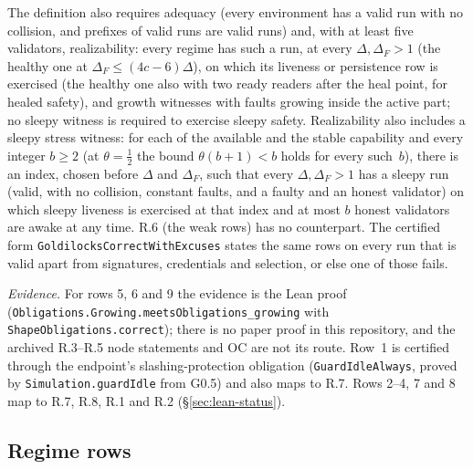 \documentclass{article}
\begin{document}
\begin{sloppypar}
The definition also requires adequacy (every environment has a valid run
with no collision, and prefixes of valid runs are valid runs) and, with at
least five validators, realizability: every regime has such a run, at
every $\Delta,\Delta_F>1$ (the healthy one at $\Delta_F\leq(4c-6)\Delta$), on which its liveness or persistence row is
exercised (the healthy one also with two ready readers after the heal
point, for healed safety), and growth witnesses with faults growing inside
the active part; no sleepy witness is required to exercise sleepy
safety.  Realizability also includes a sleepy stress witness: for each of
the available and the stable capability and every integer $b\geq2$ (at
$\theta=\tfrac12$ the bound $\theta(b+1)<b$ holds for every such~$b$),
there is an index, chosen before $\Delta$ and $\Delta_F$, such that every
$\Delta,\Delta_F>1$ has a sleepy run (valid, with no collision, constant faults, and a faulty and an honest validator) on which sleepy liveness is
exercised at that index and at most $b$ honest validators are awake at any
time.  R.6 (the weak
rows) has no counterpart.  The certified form \texttt{GoldilocksCorrectWithExcuses}
states the same rows on every run that is valid apart from signatures,
credentials and selection, or else one of those fails.

\emph{Evidence.}  For rows 5, 6 and 9 the evidence is the Lean
proof (\texttt{Obligations.Growing.meetsObligations\_growing} with
\texttt{ShapeObligations.correct}); there is no paper proof in this
repository, and the archived R.3--R.5 node statements and OC are not its
route.  Row~1 is certified through the endpoint's slashing-protection
obligation (\texttt{GuardIdleAlways}, proved by \texttt{Simulation.guardIdle}
from G0.5) and also maps to R.7.  Rows 2--4, 7 and 8 map to R.7, R.8, R.1 and R.2
(\S\ref{sec:lean-status}).
\end{sloppypar}

\subsection{Regime rows}
\end{document}
